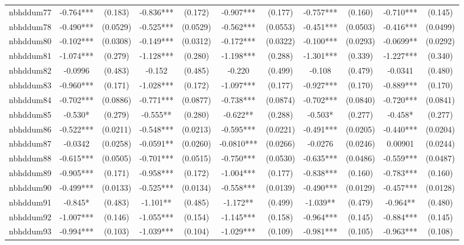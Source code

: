 \documentclass[]{article}
\begin{document}
\begin{tabular}{lcccccccccc}
nbhddum77 & -0.764*** & (0.183) & -0.836*** & (0.172) & -0.907*** & (0.177) & -0.757*** & (0.160) & -0.710*** & (0.145) \\
nbhddum78 & -0.490*** & (0.0529) & -0.525*** & (0.0529) & -0.562*** & (0.0553) & -0.451*** & (0.0503) & -0.416*** & (0.0499) \\
nbhddum80 & -0.102*** & (0.0308) & -0.149*** & (0.0312) & -0.172*** & (0.0322) & -0.100*** & (0.0293) & -0.0699** & (0.0292) \\
nbhddum81 & -1.074*** & (0.279) & -1.128*** & (0.280) & -1.198*** & (0.288) & -1.301*** & (0.339) & -1.227*** & (0.340) \\
nbhddum82 & -0.0996 & (0.483) & -0.152 & (0.485) & -0.220 & (0.499) & -0.108 & (0.479) & -0.0341 & (0.480) \\
nbhddum83 & -0.960*** & (0.171) & -1.028*** & (0.172) & -1.097*** & (0.177) & -0.927*** & (0.170) & -0.889*** & (0.170) \\
nbhddum84 & -0.702*** & (0.0886) & -0.771*** & (0.0877) & -0.738*** & (0.0874) & -0.702*** & (0.0840) & -0.720*** & (0.0841) \\
nbhddum85 & -0.530* & (0.279) & -0.555** & (0.280) & -0.622** & (0.288) & -0.503* & (0.277) & -0.458* & (0.277) \\
nbhddum86 & -0.522*** & (0.0211) & -0.548*** & (0.0213) & -0.595*** & (0.0221) & -0.491*** & (0.0205) & -0.440*** & (0.0204) \\
nbhddum87 & -0.0342 & (0.0258) & -0.0591** & (0.0260) & -0.0810*** & (0.0266) & -0.0276 & (0.0246) & 0.00901 & (0.0244) \\
nbhddum88 & -0.615*** & (0.0505) & -0.701*** & (0.0515) & -0.750*** & (0.0530) & -0.635*** & (0.0486) & -0.559*** & (0.0487) \\
nbhddum89 & -0.905*** & (0.171) & -0.958*** & (0.172) & -1.004*** & (0.177) & -0.838*** & (0.160) & -0.783*** & (0.160) \\
nbhddum90 & -0.499*** & (0.0133) & -0.525*** & (0.0134) & -0.558*** & (0.0139) & -0.490*** & (0.0129) & -0.457*** & (0.0128) \\
nbhddum91 & -0.845* & (0.483) & -1.101** & (0.485) & -1.172** & (0.499) & -1.039** & (0.479) & -0.964** & (0.480) \\
nbhddum92 & -1.007*** & (0.146) & -1.055*** & (0.154) & -1.145*** & (0.158) & -0.964*** & (0.145) & -0.884*** & (0.145) \\
nbhddum93 & -0.994*** & (0.103) & -1.039*** & (0.104) & -1.029*** & (0.109) & -0.981*** & (0.105) & -0.963*** & (0.108) \\

\end{tabular}
\end{document}
